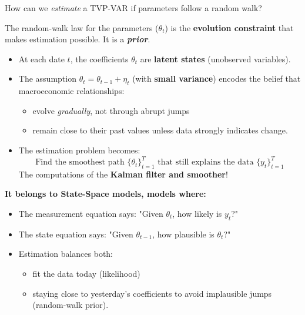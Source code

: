 \documentclass{beamer}
\begin{document}
\begin{frame}{How can we \emph{estimate} a TVP-VAR if parameters follow a random walk?}
\footnotesize

The random-walk law for the parameters ($\theta_t$) is the \textbf{evolution constraint} that makes estimation possible. It is a \textbf{\textit{prior}}. 

\begin{itemize}
  \item At each date $t$, the coefficients $\theta_t$ are \textbf{latent states} (unobserved variables).
  \item The assumption $\theta_t = \theta_{t-1} + \eta_t$ (with \textbf{small variance})
        encodes the belief that macroeconomic relationships:
        \begin{itemize}\footnotesize
          \item evolve \emph{gradually}, not through abrupt jumps
          \item remain close to their past values unless data strongly indicates change.
        \end{itemize}
  \item The estimation problem becomes:
        \[
           \text{Find the smoothest path }\{\theta_t\}_{t=1}^T 
           \text{ that still explains the data } \{y_t\}_{t=1}^T 
        \]
   The computations of the \textbf{Kalman filter and smoother}!
\end{itemize}

\smallskip
\textbf{It belongs to State-Space models, models where:}  
\begin{itemize}
  \item The measurement equation says: "Given $\theta_t$, how likely is $y_t$?"
  \item The state equation says: "Given $\theta_{t-1}$, how plausible is $\theta_t$?"
  \item Estimation balances both:
        \begin{itemize}\footnotesize
          \item fit the data today (likelihood)
          \item  staying close to yesterday’s coefficients to avoid implausible jumps (random-walk prior).
        \end{itemize}
\end{itemize}

\end{frame}
\end{document}
